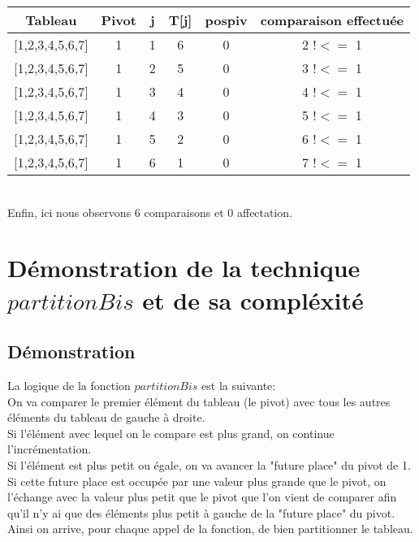 \documentclass[a4paper]{article}
\begin{document}
 \begin{tabular}{ | c | c | c | c | c | c |}
   
   Tableau          & Pivot & j     & T[j]      & pospiv & comparaison effectuée\\
   \hline
   
   [1,2,3,4,5,6,7]  & 1     & 1     & 6         & 0      & 2 $!<=$ 1\\
   
   [1,2,3,4,5,6,7]  & 1     & 2     & 5         & 0      & 3 $!<=$ 1\\
   
   [1,2,3,4,5,6,7]  & 1     & 3     & 4         & 0      & 4 $!<=$ 1 \\
   
   [1,2,3,4,5,6,7]  & 1     & 4     & 3         & 0      & 5 $!<=$ 1\\
   
   [1,2,3,4,5,6,7]  & 1     & 5     & 2         & 0      & 6 $!<=$ 1\\
   
   [1,2,3,4,5,6,7]  & 1     & 6     & 1         & 0      & 7 $!<=$ 1\\
   
 \end{tabular}
\vspace*{5 mm}\\
Enfin, ici nous observons 6 comparaisons et 0 affectation.
\section{Démonstration de la technique $partitionBis$ et de sa compléxité}

\subsection{Démonstration}
La logique de la fonction $partitionBis$ est la suivante: 
\\
On va comparer le premier élément du tableau (le pivot) avec tous les autres éléments du tableau de gauche à droite.\\
Si l'élément avec lequel on le compare est plus grand, on continue l'incrémentation.\\
Si l'élément est plus petit ou égale, on va avancer la "future place" du pivot de 1.\\
Si cette future place est occupée par une valeur plus grande que le pivot, on l'échange avec la valeur plus petit que le pivot que l'on vient de comparer afin qu'il n'y ai que des éléments plus petit à gauche de la "future place" du pivot.\\
Ainsi on arrive, pour chaque appel de la fonction, de bien partitionner le tableau.
\end{document}
